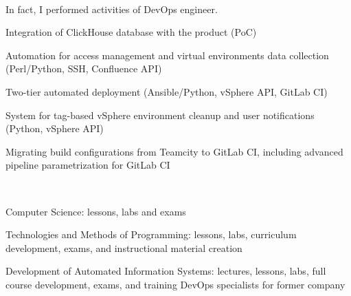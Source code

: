 \documentclass[a4paper]{MagicalCV}
\begin{document}
\begin{minipage}[t]{0.66\textwidth}
 \\
\vspace{\topsep} %
In fact, I performed activities of DevOps engineer.
\begin{tightemize}
  \item Integration of ClickHouse database with the product (PoC)
  \item Automation for access management and virtual environments data collection (Perl/Python, SSH, Confluence API)
  \item Two-tier automated deployment (Ansible/Python, vSphere API, GitLab CI)
  \item System for tag-based vSphere environment cleanup and user notifications (Python, vSphere API)
  \item Migrating build configurations from Teamcity to GitLab CI, including advanced pipeline parametrization for GitLab CI
\end{tightemize}
\sectionsep


 \\
\vspace{\topsep} %
\begin{tightemize}
  \item Computer Science: lessons, labs and exams
  \item Technologies and Methods of Programming: lessons, labs, curriculum development, exams, and instructional material creation
  \item Development of Automated Information Systems: lectures, lessons, labs, full course development, exams, and training DevOps specialists for former company
\end{tightemize}
\sectionsep

\end{minipage} 
\end{document}
